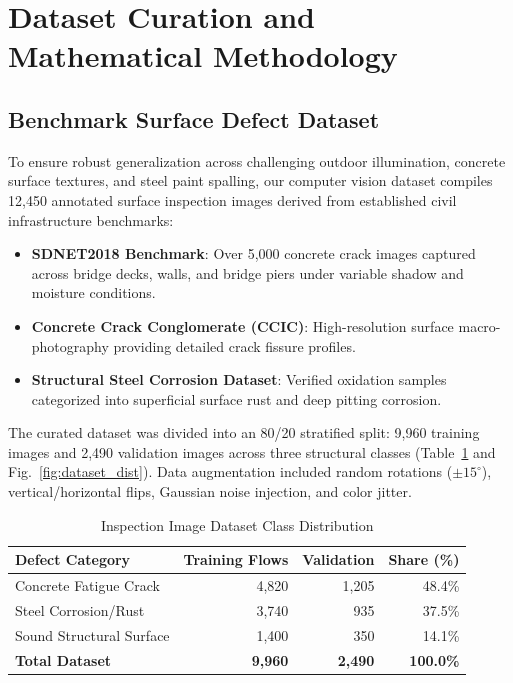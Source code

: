 \documentclass[10pt, conference, letterpaper]{IEEEtran}
\begin{document}
\section{Dataset Curation and Mathematical Methodology}

\subsection{Benchmark Surface Defect Dataset}
To ensure robust generalization across challenging outdoor illumination, concrete surface textures, and steel paint spalling, our computer vision dataset compiles 12,450 annotated surface inspection images derived from established civil infrastructure benchmarks:
\begin{itemize}
    \item \textbf{SDNET2018 Benchmark}: Over 5,000 concrete crack images captured across bridge decks, walls, and bridge piers under variable shadow and moisture conditions.
    \item \textbf{Concrete Crack Conglomerate (CCIC)}: High-resolution surface macro-photography providing detailed crack fissure profiles.
    \item \textbf{Structural Steel Corrosion Dataset}: Verified oxidation samples categorized into superficial surface rust and deep pitting corrosion.
\end{itemize}
The curated dataset was divided into an 80/20 stratified split: 9,960 training images and 2,490 validation images across three structural classes (Table~\ref{tab:dataset} and Fig.~\ref{fig:dataset_dist}). Data augmentation included random rotations ($\pm 15^\circ$), vertical/horizontal flips, Gaussian noise injection, and color jitter.

\begin{table}[h]
\caption{Inspection Image Dataset Class Distribution}
\label{tab:dataset}
\centering
\begin{tabular}{@{}lrrr@{}}
\toprule
\textbf{Defect Category} & \textbf{Training Flows} & \textbf{Validation} & \textbf{Share (\%)} \\ \midrule
Concrete Fatigue Crack   & 4,820 & 1,205 & 48.4\% \\
Steel Corrosion/Rust     & 3,740 &   935 & 37.5\% \\
Sound Structural Surface & 1,400 &   350 & 14.1\% \\ \midrule
\textbf{Total Dataset}   & \textbf{9,960} & \textbf{2,490} & \textbf{100.0\%} \\ \bottomrule
\end{tabular}
\end{table}
\end{document}
